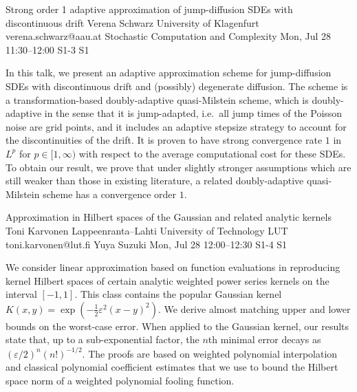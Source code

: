 \begin{talk}
  {Strong order 1 adaptive approximation of jump-diffusion SDEs with discontinuous drift}%
  {Verena Schwarz}%
  {University of Klagenfurt}%
  {verena.schwarz@aau.at}%
  {Stochastic Computation and Complexity}%
  {}%
  {Mon, Jul 28 11:30--12:00}%
  {S1-3}%
  {S1}%
    

In this talk, we present an adaptive approximation scheme for jump-diffusion SDEs with discontinuous drift and (possibly) degenerate diffusion. The scheme is a transformation-based doubly-adaptive quasi-Milstein scheme, which 
is doubly-adaptive in the sense that it is jump-adapted, i.e.~all jump times of the Poisson noise are grid points, and it includes an adaptive stepsize strategy to account for the discontinuities of the drift. It is proven to have strong convergence rate $1$ in $L^p$ for $p\in[1,\infty)$ with respect to the average computational cost for these SDEs. 
To obtain our result, we prove that under slightly stronger assumptions which are still weaker than those in existing literature, a related doubly-adaptive quasi-Milstein scheme has a convergence order $1$. 
\end{talk}

\begin{talk}
  {Approximation in Hilbert spaces of the Gaussian and related analytic kernels}%
  {Toni Karvonen}%
  {Lappeenranta--Lahti University of Technology LUT}%
  {toni.karvonen@lut.fi}%
  {Yuya Suzuki}%
  {}%
  {Mon, Jul 28 12:00--12:30}%
  {S1-4}%
  {S1}%
  
    
   

\medskip

We consider linear approximation based on function evaluations in reproducing
kernel Hilbert spaces of certain analytic weighted power series kernels on the interval $[-1, 1]$. This class contains the popular Gaussian kernel $K(x, y) = \exp(-\frac{1}{2} \varepsilon^2(x-y)^2)$.
We derive almost matching upper and lower bounds on the worst-case error. When applied to
the Gaussian kernel, our results state that, up to a sub-exponential factor, the
$n$th minimal error decays as $(\varepsilon/2)^n (n!)^{-1/2}$. The proofs are based on weighted
polynomial interpolation and classical polynomial coefficient estimates that we use
to bound the Hilbert space norm of a weighted polynomial fooling function.
\end{talk}

